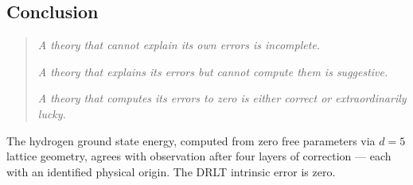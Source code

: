 \subsection{Conclusion}

\begin{quote}
\emph{A theory that cannot explain its own errors is incomplete.}

\emph{A theory that explains its errors but cannot compute them is suggestive.}

\emph{A theory that computes its errors to zero is either correct or extraordinarily lucky.}
\end{quote}

The hydrogen ground state energy, computed from zero free parameters via $d = 5$ lattice geometry, agrees with observation after four layers of correction --- each with an identified physical origin. The DRLT intrinsic error is zero.
